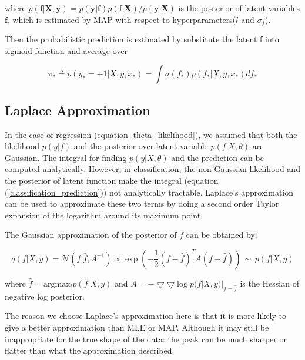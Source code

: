 \documentclass[11pt]{report}
\numberwithin{equation}{chapter}
\begin{document}
\begin{spacing}{2}
where \(p(\boldsymbol f|\boldsymbol X,\boldsymbol y) = {p(\boldsymbol y|\boldsymbol f)p(\boldsymbol f|\boldsymbol X)}/{p(\boldsymbol y|\boldsymbol X)}\) is the posterior of latent variables $\boldsymbol f$, which is estimated by MAP with respect to hyperparameters($l$ and $\sigma_f$).

Then the probabilistic prediction is estimated by substitute the latent f into sigmoid function and average over 

\begin{equation}
\label{predictive_probability}
\bar{\pi}_* \triangleq p(y_* = +1|X,y,x_*) = \int \sigma (f_*)p(f_*|X,y,x_*) df_*
\end{equation}


\subsection{Laplace Approximation}

In the case of regression (equation \ref{theta_likelihood}), we assumed that both the likelihood $p(y|f)$ and the posterior over latent variable $p(f|X,\theta)$ are Gaussian. The integral for finding $p(y|X,\theta)$ and the prediction can be computed analytically. However, in classification, the non-Gaussian likelihood and the posterior of latent function make the integral (equation (\ref{classification_prediction})) not analytically tractable. Laplace's approximation can be used to approximate these two terms by doing a second order Taylor expansion of the logarithm around its maximum point. 

The Gaussian approximation of the posterior of $f$ can be obtained by:


\begin{equation}\label{LaplaceApp}
q(f|X,y) = \mathcal{N}(f|\hat{f},A^{-1}) \propto \operatorname{exp}(-\frac{1}{2}(f-\hat{f})^T A(f-\hat{f})) \,\sim\, p(f|X,y)
\end{equation}

where $\hat{f} = \operatorname{argmax_f} p(f|X,y)$ and $A = -\bigtriangledown\bigtriangledown \operatorname{log}p(f|X,y)|_{f=\hat{f}}$ is the Hessian of negative log posterior.


The reason we choose Laplace's approximation here is that it is more likely to give a better approximation than MLE or MAP\cite{azevedo1994laplace}. Although it may still be inappropriate for the true shape of the data: the peak can be much sharper or flatter than what the approximation described. 




\end{spacing}
\end{document}

